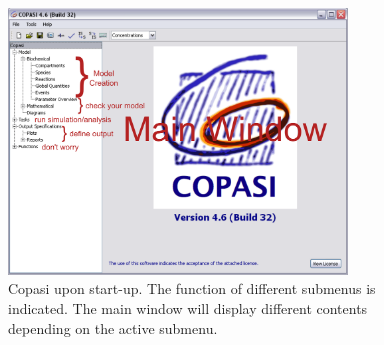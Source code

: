 \documentclass[a4paper,11pt,twoside]{article}
\begin{document}
\begin{figure}[b!]
 \centering
 \includegraphics[width=09cm]{Pictures/CopasiMainWindow.pdf}
 \caption{\footnotesize Copasi upon start-up. The function of different submenus is indicated.  The main window will display different contents depending on the active submenu.}
 \label{fig:MainWindow}
\end{figure}
\end{document}
